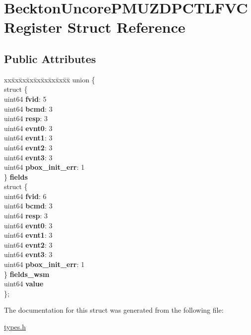 \hypertarget{struct_beckton_uncore_p_m_u_z_d_p_c_t_l_f_v_c_register}{}\section{Beckton\+Uncore\+P\+M\+U\+Z\+D\+P\+C\+T\+L\+F\+V\+C\+Register Struct Reference}
\label{struct_beckton_uncore_p_m_u_z_d_p_c_t_l_f_v_c_register}
\subsection*{Public Attributes}
\begin{DoxyCompactItemize}
\item 
\mbox{\label{struct_beckton_uncore_p_m_u_z_d_p_c_t_l_f_v_c_register_a9b5fa9ee1e636c218529636d75c9cc02}} 
\begin{tabbing}
xx\=xx\=xx\=xx\=xx\=xx\=xx\=xx\=xx\=\kill
union \{\\
\>struct \{\\
\>\>uint64 {\bfseries fvid}: 5\\
\>\>uint64 {\bfseries bcmd}: 3\\
\>\>uint64 {\bfseries resp}: 3\\
\>\>uint64 {\bfseries evnt0}: 3\\
\>\>uint64 {\bfseries evnt1}: 3\\
\>\>uint64 {\bfseries evnt2}: 3\\
\>\>uint64 {\bfseries evnt3}: 3\\
\>\>uint64 {\bfseries pbox\_init\_err}: 1\\
\>\} {\bfseries fields}\\
\>struct \{\\
\>\>uint64 {\bfseries fvid}: 6\\
\>\>uint64 {\bfseries bcmd}: 3\\
\>\>uint64 {\bfseries resp}: 3\\
\>\>uint64 {\bfseries evnt0}: 3\\
\>\>uint64 {\bfseries evnt1}: 3\\
\>\>uint64 {\bfseries evnt2}: 3\\
\>\>uint64 {\bfseries evnt3}: 3\\
\>\>uint64 {\bfseries pbox\_init\_err}: 1\\
\>\} {\bfseries fields\_wsm}\\
\>uint64 {\bfseries value}\\
\}; \\

\end{tabbing}\end{DoxyCompactItemize}


The documentation for this struct was generated from the following file\+:\begin{DoxyCompactItemize}
\item 
\mbox{\hyperlink{types_8h}{types.\+h}}\end{DoxyCompactItemize}
